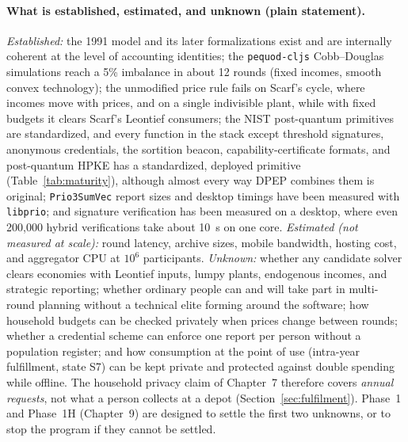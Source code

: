 \documentclass[10pt,twoside,openany]{book}
\theoremstyle{dpepstyle}
\begin{document}
\paragraph{What is established, estimated, and unknown (plain statement).}
\emph{Established:} the 1991 model and its later formalizations exist and are internally coherent at the level of accounting identities; the \texttt{pequod-cljs} Cobb--Douglas simulations reach a 5\% imbalance in about 12 rounds (fixed incomes, smooth convex technology); the unmodified price rule fails on Scarf's cycle, where incomes move with prices, and on a single indivisible plant, while with fixed budgets it clears Scarf's Leontief consumers; the NIST post-quantum primitives are standardized, and every function in the stack except threshold signatures, anonymous credentials, the sortition beacon, capability-certificate formats, and post-quantum HPKE has a standardized, deployed primitive (Table~\ref{tab:maturity}), although almost every way DPEP combines them is original; \texttt{Prio3SumVec} report sizes and desktop timings have been measured with \texttt{libprio}; and signature verification has been measured on a desktop, where even 200,000 hybrid verifications take about 10~s on one core. \emph{Estimated (not measured at scale):} round latency, archive sizes, mobile bandwidth, hosting cost, and aggregator CPU at $10^6$ participants. \emph{Unknown:} whether any candidate solver clears economies with Leontief inputs, lumpy plants, endogenous incomes, and strategic reporting; whether ordinary people can and will take part in multi-round planning without a technical elite forming around the software; how household budgets can be checked privately when prices change between rounds; whether a credential scheme can enforce one report per person without a population register; and how consumption at the point of use (intra-year fulfillment, state S7) can be kept private and protected against double spending while offline. The household privacy claim of Chapter~7 therefore covers \emph{annual requests}, not what a person collects at a depot (Section~\ref{sec:fulfilment}). Phase~1 and Phase~1H (Chapter~9) are designed to settle the first two unknowns, or to stop the program if they cannot be settled.
\end{document}
